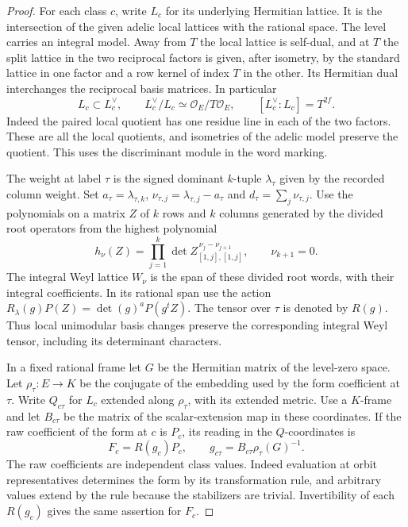 \begin{proof}

For each class \(c\), write \(L_c\) for its underlying Hermitian
lattice. It is the intersection of the given adelic local lattices with the
rational space. The level carries an integral model. Away from \(T\)
the local lattice is self-dual, and at \(T\) the split lattice in the
two reciprocal factors is given, after isometry, by the standard
lattice in one factor and a row kernel of index \(T\) in the other.
Its Hermitian dual interchanges the reciprocal basis matrices.
In particular
\begin{equation}\label{eq:selected-column-discriminant}
 L_c\subset L_c^\vee,\qquad
 L_c^\vee/L_c\simeq \mathcal O_E/T\mathcal O_E,\qquad
 [L_c^\vee:L_c]=T^{2f}.
\end{equation}
Indeed the paired local quotient has one residue line in each
of the two factors. These are all the local quotients, and isometries
of the adelic model preserve the quotient. This uses the
discriminant module in the word marking.
\label{cor:selected-column-metric-1}


The weight at label \(\tau\) is the signed dominant \(k\)-tuple
\(\lambda_\tau\) given by the recorded column weight. Set
\(a_\tau=\lambda_{\tau,k}\),
\(\nu_{\tau,j}=\lambda_{\tau,j}-a_\tau\) and
\(d_\tau=\sum_j\nu_{\tau,j}\). Use the polynomials on a matrix \(Z\)
of \(k\) rows and \(k\) columns generated by the divided root
operators from the highest polynomial
\[
 h_\nu(Z)=\prod_{j=1}^k\det Z_{[1,j],[1,j]}^{\,\nu_j-\nu_{j+1}},
 \qquad \nu_{k+1}=0.
\]
The integral Weyl lattice \(W_\nu\) is the span of these divided
root words, with their integral coefficients. In its rational
span use the action \(R_\lambda(g)P(Z)=\det(g)^aP(g^t Z)\).
The tensor over \(\tau\) is denoted by \(R(g)\). Thus local
unimodular basis changes preserve the corresponding integral
Weyl tensor, including its determinant characters.


In a fixed rational frame let \(G\) be the Hermitian matrix
of the level-zero space. Let \(\rho_\tau:E\to K\) be the conjugate
of the embedding used by the form coefficient at \(\tau\).
Write \(Q_{c\tau}\) for \(L_c\) extended along \(\rho_\tau\),
with its extended metric. Use a \(K\)-frame and let \(B_{c\tau}\)
be the matrix of the scalar-extension map in these coordinates.
If the raw coefficient of the form at \(c\) is \(P_c\), its
reading in the \(Q\)-coordinates is
\[
   F_c=R(g_c)P_c,\qquad
   g_{c\tau}=B_{c\tau}\rho_\tau(G)^{-1}.
\]
The raw coefficients are independent class values. Indeed
evaluation at orbit representatives determines the form by its
transformation rule, and arbitrary values extend by the rule
because the stabilizers are trivial. Invertibility of each
\(R(g_c)\) gives the same assertion for \(F_c\).


\end{proof}
